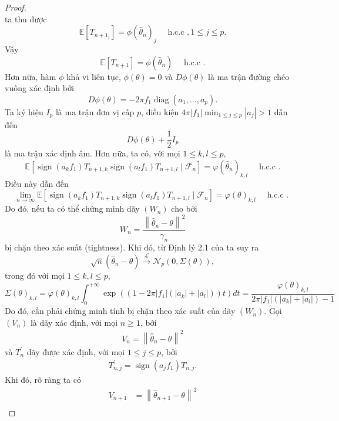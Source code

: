 \begin{proof}
$$$$
ta thu được
$$
 \mathbb{E}\left[T_{n+1_j}\right] = \phi\left(\widehat{\theta}_{n}\right)_j \quad \text { h.c.c }, 1 \leq j \leq p.
$$
Vậy 
$$
 \mathbb{E}\left[T_{n+1}\right] = \phi\left(\widehat{\theta}_{n}\right) \quad \text { h.c.c .}
$$
Hơn nữa, hàm $\phi$ khả vi liên tục, $\phi(\theta)=0$ và $D \phi(\theta)$ là ma trận đường chéo vuông xác định bởi
$$
D \phi(\theta)=-2 \pi f_{1} \operatorname{diag}\left(a_{1}, \ldots, a_{p}\right).
$$
Ta ký hiệu $I_{p}$ là ma trận đơn vị cấp $p$, điều kiện $4 \pi\left|f_{1}\right| \min _{1 \leq j \leq p}\left|a_{j}\right|>1$ dẫn đến
$$
D \phi(\theta)+\frac{1}{2} I_{p}
$$
là ma trận xác định âm. Hơn nữa, ta có, với mọi $1 \leq k, l \leq p$,
$$
\mathbb{E}\left[\operatorname{sign}\left(a_{k} f_{1}\right) T_{n+1, k} \operatorname{sign}\left(a_{l} f_{1}\right) T_{n+1, l} \mid \mathcal{F}_{n}\right]=\varphi\left(\widehat{\theta}_{n}\right)_{k, l} \quad \text { h.c.c .}
$$
Điều này dẫn đến
$$
\lim _{n \rightarrow \infty} \mathbb{E}\left[\operatorname{sign}\left(a_{k} f_{1}\right) T_{n+1, k} \operatorname{sign}\left(a_{l} f_{1}\right) T_{n+1, l} \mid \mathcal{F}_{n}\right]=\varphi(\theta)_{k, l} \quad \text { h.c.c . }
$$
Do đó, nếu ta có thể chứng minh dãy $\left(W_{n}\right)$ cho bởi
$$
W_{n}=\frac{\left\|\widehat{\theta}_{n}-\theta\right\|^{2}}{\gamma_{n}}
$$
bị chặn theo xác suất (tightness). Khi đó, từ Định lý 2.1 của \cite{kushner} ta suy ra
$$
\sqrt{n}\left(\widehat{\theta}_{n}-\theta\right) \stackrel{\mathcal{L}}{\longrightarrow} \mathcal{N}_{p}(0, \Sigma(\theta)),
$$
trong đó với mọi $1 \leq k, l \leq p$,
$$
\Sigma(\theta)_{k, l}=\varphi(\theta)_{k, l} \int_{0}^{+\infty} \exp \left(\left(1-2 \pi\left|f_{1}\right|\left(\left|a_{k}\right|+\left|a_{l}\right|\right)\right) t\right) d t=\frac{\varphi(\theta)_{k, l}}{2 \pi\left|f_{1}\right|\left(\left|a_{k}\right|+\left|a_{l}\right|\right)-1}
$$
Do đó, cần phải chứng minh tính bị chặn theo xác suất của dãy $\left(W_{n}\right)$. 
Gọi $\left(V_{n}\right)$ là dãy xác định, với mọi $n \geq 1$, bởi
\begin{align}
    V_{n}=\left\|\widehat{\theta}_{n}-\theta\right\|^{2}
    \label{8.1}
\end{align}
và $T_{n}^{\prime}$ dãy được xác định, với mọi $1 \leq j \leq p$, bởi
\begin{align}
    T_{n, j}^{\prime}=\operatorname{sign}\left(a_{j} f_{1}\right) T_{n, j}.
\label{8.2}
\end{align}
Khi đó, rõ ràng ta có
$$
\begin{aligned}
V_{n+1} & =\left\|\widehat{\theta}_{n+1}-\theta\right\|^{2} \\

\end{aligned}$$
\end{proof}
